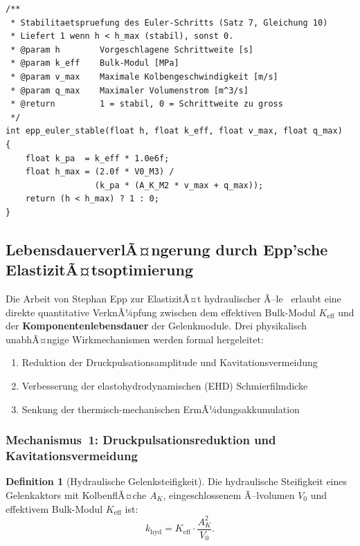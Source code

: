 ﻿\documentclass[a4paper,12pt]{scrreprt}
\theoremstyle{definition}
\newtheorem{definition}{Definition}[section]
\begin{document}
\begin{lstlisting}
/**
 * Stabilitaetspruefung des Euler-Schritts (Satz 7, Gleichung 10)
 * Liefert 1 wenn h < h_max (stabil), sonst 0.
 * @param h        Vorgeschlagene Schrittweite [s]
 * @param k_eff    Bulk-Modul [MPa]
 * @param v_max    Maximale Kolbengeschwindigkeit [m/s]
 * @param q_max    Maximaler Volumenstrom [m^3/s]
 * @return         1 = stabil, 0 = Schrittweite zu gross
 */
int epp_euler_stable(float h, float k_eff, float v_max, float q_max)
{
    float k_pa  = k_eff * 1.0e6f;
    float h_max = (2.0f * V0_M3) /
                  (k_pa * (A_K_M2 * v_max + q_max));
    return (h < h_max) ? 1 : 0;
}
\end{lstlisting}

\subsection{LebensdauerverlÃ¤ngerung durch Epp'sche ElastizitÃ¤tsoptimierung}

Die Arbeit von Stephan Epp zur ElastizitÃ¤t hydraulischer Ã–le~\cite{hydr2026}
erlaubt eine direkte quantitative VerknÃ¼pfung zwischen dem effektiven
Bulk-Modul $K_{\text{eff}}$ und der \textbf{Komponentenlebensdauer}
der Gelenkmodule. Drei physikalisch unabhÃ¤ngige Wirkmechanismen werden
formal hergeleitet:

\begin{enumerate}
  \item Reduktion der Druckpulsationsamplitude und Kavitationsvermeidung
  \item Verbesserung der elastohydrodynamischen (EHD) Schmierfilmdicke
  \item Senkung der thermisch-mechanischen ErmÃ¼dungsakkumulation
\end{enumerate}

\subsubsection{Mechanismus~1: Druckpulsationsreduktion und Kavitationsvermeidung}

\begin{definition}[Hydraulische Gelenksteifigkeit]
\label{def:hyd_steif}
Die hydraulische Steifigkeit eines Gelenkaktors mit KolbenflÃ¤che $A_K$,
eingeschlossenem Ã–lvolumen $V_0$ und effektivem Bulk-Modul $K_{\text{eff}}$ ist:
\begin{equation}
  k_{\text{hyd}} = K_{\text{eff}} \cdot \frac{A_K^2}{V_0}.
  \label{eq:khyd}
\end{equation}
\end{definition}
\end{document}

